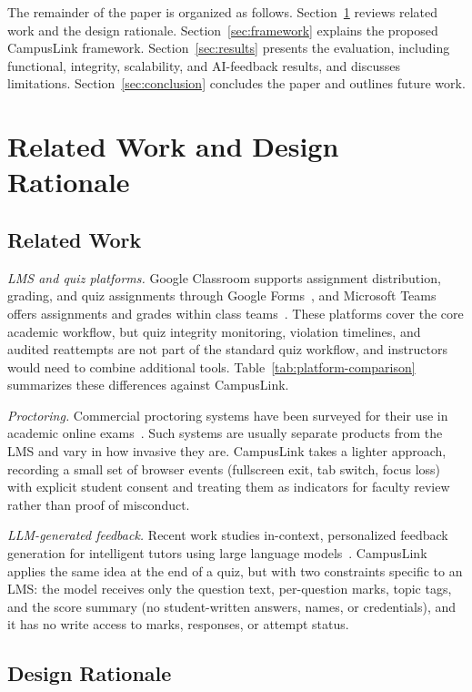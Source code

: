 \documentclass[conference]{IEEEtran}
\begin{document}
The remainder of the paper is organized as follows. Section~\ref{sec:related} reviews related work and the design rationale. Section~\ref{sec:framework} explains the proposed CampusLink framework. Section~\ref{sec:results} presents the evaluation, including functional, integrity, scalability, and AI-feedback results, and discusses limitations. Section~\ref{sec:conclusion} concludes the paper and outlines future work.

\section{Related Work and Design Rationale}
\label{sec:related}

\subsection{Related Work}

\textit{LMS and quiz platforms.} Google Classroom supports assignment distribution, grading, and quiz assignments through Google Forms~\cite{googleclassroom,googlequiz}, and Microsoft Teams offers assignments and grades within class teams~\cite{msteams}. These platforms cover the core academic workflow, but quiz integrity monitoring, violation timelines, and audited reattempts are not part of the standard quiz workflow, and instructors would need to combine additional tools. Table~\ref{tab:platform-comparison} summarizes these differences against CampusLink.

\textit{Proctoring.} Commercial proctoring systems have been surveyed for their use in academic online exams~\cite{proctorsurvey}. Such systems are usually separate products from the LMS and vary in how invasive they are. CampusLink takes a lighter approach, recording a small set of browser events (fullscreen exit, tab switch, focus loss) with explicit student consent and treating them as indicators for faculty review rather than proof of misconduct.

\textit{LLM-generated feedback.} Recent work studies in-context, personalized feedback generation for intelligent tutors using large language models~\cite{incontextfeedback}. CampusLink applies the same idea at the end of a quiz, but with two constraints specific to an LMS: the model receives only the question text, per-question marks, topic tags, and the score summary (no student-written answers, names, or credentials), and it has no write access to marks, responses, or attempt status.

\subsection{Design Rationale}
\end{document}
